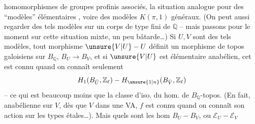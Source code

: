 homomorphismes de groupes profinis associés,   la situation analogue pour des ``modèles'' élémentaires , voire des modèles $K(\pi,1)$ généraux. (On peut aussi regarder des tels modèles sur un corps   de type fini de $\mathbb Q$ -- mais passons pour le moment sur cette situation mixte, un peu bâtarde\ldots) Si $U,V$ sont des tels modèles, tout morphisme $\unsure{V|U}-U$ définit un morphisme de topos galoisiens sur $B_{\mathbb Q}$, $B_U\longrightarrow B_V$,  et si $\unsure{V|U}$ est  élémentaire anabélien, cet  est connu quand on connaît seulement
\[
H_1(B_{\bar U},\mathbb Z_{\ell})-H_{\unsure{1|n}}(B_{\bar V},\mathbb Z_{\ell})
\]
-- ce qui est beaucoup moins que la classe d'iso. du hom. de $B_{\mathbb Q}$-topos. (En fait,   anabélienne sur $V$, dès que $V$  dans une VA, $f$ est connu quand on connaît son action sur les types étales\ldots). Mais quels sont les hom $B_U-B_V$, ou $\mathcal E_U-\mathcal E_V$
